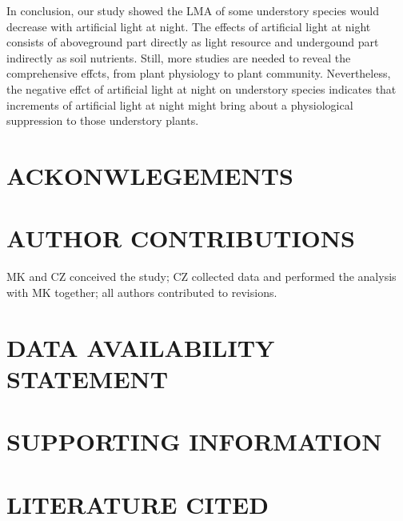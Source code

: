 \documentclass[
]{article}
\begin{document}
In conclusion, our study showed the LMA of some understory species would
decrease with artificial light at night. The effects of artificial light
at night consists of aboveground part directly as light resource and
undergound part indirectly as soil nutrients. Still, more studies are
needed to reveal the comprehensive effcts, from plant physiology to
plant community. Nevertheless, the negative effct of artificial light at
night on understory species indicates that increments of artificial
light at night might bring about a physiological suppression to those
understory plants.

\hypertarget{ackonwlegements}{%
\section{ACKONWLEGEMENTS}\label{ackonwlegements}}

\hypertarget{author-contributions}{%
\section{AUTHOR CONTRIBUTIONS}\label{author-contributions}}

MK and CZ conceived the study; CZ collected data and performed the
analysis with MK together; all authors contributed to revisions.

\hypertarget{data-availability-statement}{%
\section{DATA AVAILABILITY
STATEMENT}\label{data-availability-statement}}

\hypertarget{supporting-information}{%
\section{SUPPORTING INFORMATION}\label{supporting-information}}

\hypertarget{literature-cited}{%
\section{LITERATURE CITED}\label{literature-cited}}
\end{document}
